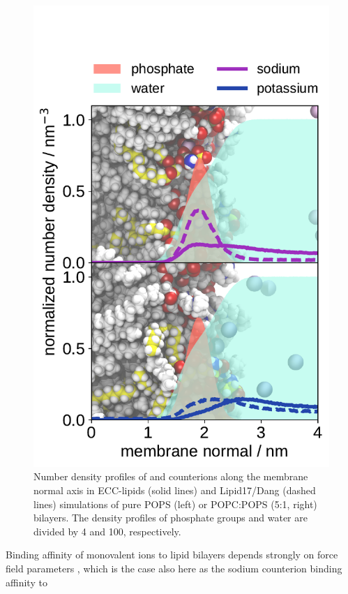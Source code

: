 \documentclass[journal=jpcbfk,manuscript=article]{achemso}
\newlength{\figheight}
\begin{document}
\begin{figure}[tbp!]
  \includegraphics[height=\figheight]{../img/ecc_pops/density_profiles_na-k-counterions_wat_phos_compar_5PC-1PS_ecclipids-lipid17.pdf}
  \caption{\label{fig:POPS-counterions-dens}
    Number density profiles of  and  counterions along the membrane normal axis
    in ECC-lipids (solid lines) and Lipid17/Dang (dashed lines) simulations of pure POPS (left) or POPC:POPS (5:1, right) bilayers.  
    The density profiles of phosphate groups and water are divided by 4 and 100, respectively.  
}
\end{figure} 
Binding affinity of monovalent ions to lipid bilayers depends strongly on
force field parameters \cite{catte16,NMRlipidsIV},
which is the case also here as the sodium counterion binding affinity to
\end{document}
